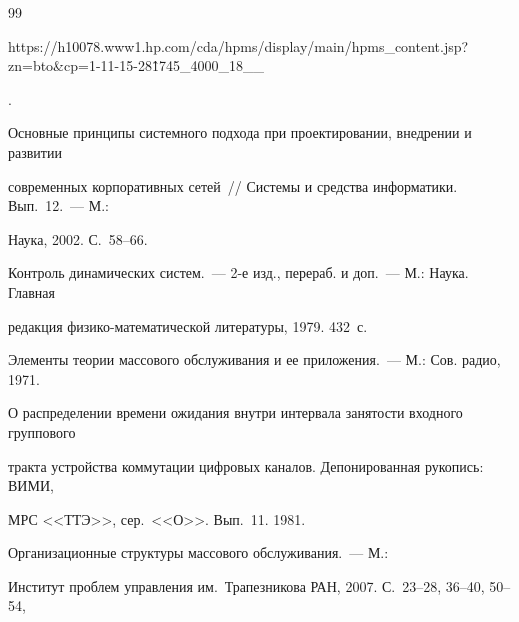 {{\begin{thebibliography}{99}


{\sf 


https://h10078.www1.hp.com/cda/hpms/display/main/hpms\_content.jsp?zn=bto\&\linebreak cp=1-11-15-28\^1745\_4000\_18\_\_}.









Основные принципы системного подхода при проектировании, внедрении и развитии 


современных корпоративных сетей~// Системы и средства информатики. Вып.~12.~--- М.: 


Наука, 2002. С.~58--66.









Контроль динамических систем.~--- 2-е изд., перераб. и доп.~--- М.: Наука. Главная 


редакция физико-математической литературы, 1979. 432~с.









Элементы теории массового обслуживания и ее приложения.~--- М.: Сов. радио, 1971.












О распределении времени ожидания внутри интервала занятости входного группового 


тракта устройства коммутации цифровых каналов. Депонированная рукопись: ВИМИ, 


МРС <<ТТЭ>>, сер.\ <<О>>. Вып.~11. 1981.









Организационные структуры массового обслуживания.~--- М.: 


Институт проблем управления им.\ Трапезникова РАН, 2007. С.~23--28, 36--40, 50--54, 



\end{thebibliography}}}
